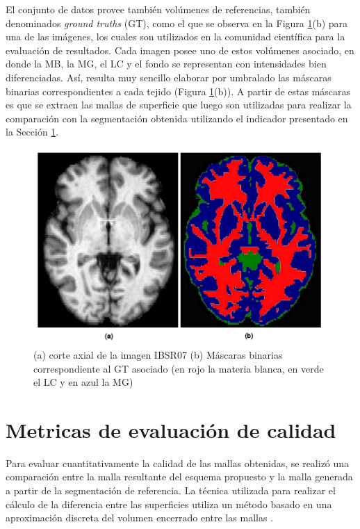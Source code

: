 El conjunto de datos provee también volúmenes de referencias, también denominados \emph{ground truths} (GT), como el que se observa en la Figura \ref{fig:GT}(b) para una de las imágenes, los cuales son utilizados en la comunidad científica para la evaluación de resultados. Cada imagen posee uno de estos volúmenes asociado, en donde la MB, la MG, el LC y el fondo se representan con intensidades bien diferenciadas. Así, resulta muy sencillo elaborar por umbralado las máscaras binarias correspondientes a cada tejido (Figura \ref{fig:GT}(b)). A partir de estas máscaras es que se extraen las mallas de superficie que luego son utilizadas para realizar la comparación con la segmentación obtenida utilizando el indicador presentado en la Sección \ref{section:metricas_calidad}.

\begin{figure}[H]
	\centering
	\includegraphics[scale=0.06]{images/IBSRvsGT.jpg}
	\caption{(a) corte axial de la imagen IBSR07 (b) Máscaras binarias correspondiente al GT asociado (en rojo la materia blanca, en verde el LC y en azul la MG)}
	\label{fig:GT}
\end{figure}

\section{Metricas de evaluación de calidad}\label{section:metricas_calidad}
Para evaluar cuantitativamente la calidad de las mallas obtenidas, se realizó una comparación entre la malla resultante del esquema propuesto y la malla generada a partir de la segmentación de referencia. La técnica utilizada para realizar el cálculo de la diferencia entre las superficies utiliza un método basado en una aproximación discreta del volumen encerrado entre las mallas \citep{d2008indicador}.

